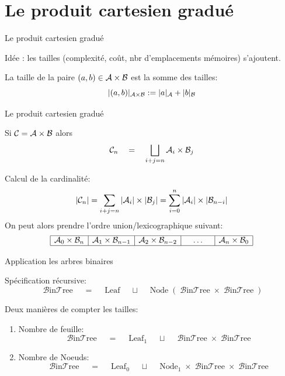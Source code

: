\documentclass{beamer}
\def\opstyle#1{\ensuremath{\operatorname{#1}}}
\begin{document}
\section{Le produit cartesien gradué}
\begin{frame}{Le produit cartesien gradué}

  Idée : les tailles (complexité, coût, nbr d'emplacements mémoires)
  s'ajoutent.
  \bigskip
  \begin{definition}
    La taille de la paire $(a, b)\in \mathcal{A}\times \mathcal{B}$ est la somme des tailles:
    \[|(a, b)|_{\mathcal{A}\times\mathcal{B}} := |a|_{\mathcal{A}} + |b|_{\mathcal{B}}\]
  \end{definition}
\end{frame}

\begin{frame}{Le produit cartesien gradué}

  \begin{NOTE}
    Si $\mathcal{C} = \mathcal{A} \times \mathcal{B}$ alors
    \[
    \mathcal{C}_n\quad=\quad\bigsqcup_{i+j=n}  \mathcal{A}_i \times \mathcal{B}_j
    \]
  \end{NOTE}
  \bigskip\pause

  Calcul de la cardinalité:
  \[
  |\mathcal{C}_n| = \sum_{i+j=n}  |\mathcal{A}_i| \times |\mathcal{B}_j| = 
          \sum_{i=0}^{n}  |\mathcal{A}_i| \times |\mathcal{B}_{n-i}|
  \]
  On peut alors prendre l'ordre union/lexicographique suivant:
  \[
  \begin{array}{|c|c|c|c|c|c|}
    \hline
    \mathcal{A}_0\times \mathcal{B}_n &     \mathcal{A}_1\times \mathcal{B}_{n-1} &  \mathcal{A}_2\times \mathcal{B}_{n-2} &  
    \quad\dots\quad &
    \mathcal{A}_{n}\times \mathcal{B}_{0}
    \\ \hline
  \end{array}
  \]

\end{frame}

\newcommand{\BinTree}{\opstyle{\mathcal{B}in\mathcal{T}ree}}
\newcommand{\Leaf}{\opstyle{Leaf}}
\newcommand{\Node}{\opstyle{Node}}

\begin{frame}{Application les arbres binaires}

  Spécification récursive:
  \[\BinTree\quad=\quad\Leaf\quad \sqcup\quad \Node(\BinTree\times\BinTree)\]
  \pause\bigskip

  Deux manières de compter les tailles:
  \begin{enumerate}
  \item Nombre de feuille:
  \[\BinTree\quad=\quad\Leaf_1\quad \sqcup\quad \BinTree\times\BinTree\]
  \item Nombre de Noeuds:
  \[\BinTree\quad=\quad\Leaf_0\quad \sqcup\quad \Node_1\times\BinTree\times\BinTree\]
  \end{enumerate}
\end{frame}
\end{document}
